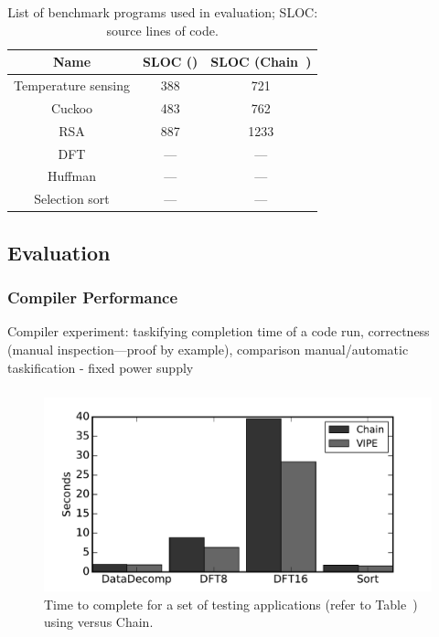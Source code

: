 \begin{table}
	\begin{tabular}{|c|c|c|}
		\hline
		Name & SLOC (\sys) & SLOC (Chain~\cite{chain})\\
		\hline\hline
		Temperature sensing & 388 & 721 \\ %
		Cuckoo & 483 & 762 \\ %
		RSA & 887 & 1233 \\ %
		DFT & --- & --- \\ %
		Huffman & --- & --- \\ %
		Selection sort & --- & --- \\
		\hline
	\end{tabular}
\caption{List of benchmark programs used in \sys evaluation; SLOC: source lines of code.}
\label{table:benchmark_list}
\end{table}

\subsection{Evaluation}
\label{sec:results_evaluation}

\subsubsection{Compiler Performance}
\label{sec:results_compiler}

Compiler experiment: taskifying completion time of a code run, correctness (manual inspection---proof by example), comparison manual/automatic taskification - fixed power supply


\subsubsection{}
\label{sec:}

\begin{figure}
	\centering
	\includegraphics[width=\columnwidth]{figures/chain_vipe}
	\caption{Time to complete for a set of testing applications (refer to Table~\cite{table:benchmark_list}) using \sys versus Chain.}
	\label{fig:IPOSPerformance}
\end{figure}

